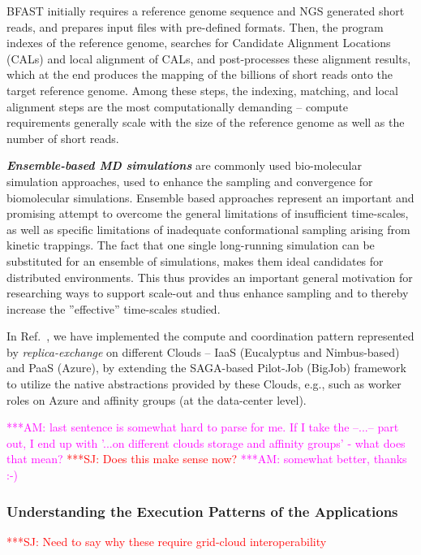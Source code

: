 \documentclass[10pt,conference,final,letterpaper,twoside,twocolumn,]{IEEEtran}
\newcommand{\amnote}[1]{  {\textcolor{magenta} {***AM: #1}}}
\newcommand{\jhanote}[1]{ {\textcolor{red}     {***SJ: #1}}}
\newcommand{\amnote}[1]{}
\newcommand{\jhanote}[1]{}
\newcommand{\I}[1]{\textit{#1}}
\newcommand{\B}[1]{\textbf{#1}}
\newcommand{\BI}[1]{\B{\I{#1}}}
\begin{document}
 BFAST initially requires a reference genome sequence and NGS
 generated short reads, and prepares input files with pre-defined
 formats.  Then, the program indexes of the reference genome, searches
 for Candidate Alignment Locations (CALs) and local alignment of CALs,
 and post-processes these alignment results, which at the end produces
 the mapping of the billions of short reads onto the target reference
 genome.  Among these steps, the indexing, matching, and local
 alignment steps are the most computationally demanding -- compute
 requirements generally scale with the size of the reference genome as
 well as the number of short reads.

 \BI{Ensemble-based MD simulations} are commonly used bio-molecular
 simulation approaches, used to enhance the sampling and convergence
 for biomolecular simulations.  Ensemble based approaches represent an
 important and promising attempt to overcome the general limitations
 of insufficient time-scales, as well as specific limitations of
 inadequate conformational sampling arising from kinetic trappings.
 The fact that one single long-running simulation can be substituted
 for an ensemble of simulations, makes them ideal candidates for
 distributed environments.  This thus provides an important general
 motivation for researching ways to support scale-out and thus enhance
 sampling and to thereby increase the ''effective'' time-scales
 studied.
 
 In Ref.~\cite{ccgrid10, cloudcom10}, we have implemented the compute
 and coordination pattern represented by \I{replica-exchange} on
 different Clouds -- IaaS (Eucalyptus and Nimbus-based) and PaaS
 (Azure), by extending the SAGA-based Pilot-Job (BigJob) framework to
 utilize the native abstractions provided by these Clouds, e.g., such
 as worker roles on Azure and affinity groups (at the data-center
 level).

 \amnote{last sentence is somewhat hard to parse for me.  If I take
   the --...-- part out, I end up with '...on different clouds storage
   and affinity groups' - what does that mean?}
 \jhanote{Does this make sense now?}
 \amnote{somewhat better, thanks :-)}


 \subsubsection*{Understanding the Execution Patterns of the
   Applications}

 \jhanote{Need to say why these require grid-cloud interoperability}
 
\end{document}
